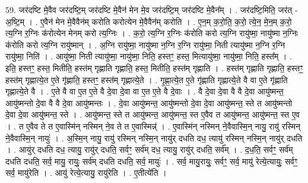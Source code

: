 \documentclass[17pt]{extarticle}
\begin{document}
59. जर॑दष्टि मे॒वैव जर॑दष्टि॒म् जर॑दष्टि मे॒वैन॑ मेन मे॒व जर॑दष्टि॒म् जर॑दष्टि मे॒वैन᳚म् । . जर॑दष्टि॒मिति॒ जर॑त् - अ॒ष्टि॒म् । . ए॒वैन॑ मेन मे॒वैवैन॑म् करोति करोत्येन मे॒वैवैन॑म् करोति । . ए॒न॒म् क॒रो॒ति॒ क॒रो॒ त्ये॒न॒ मे॒न॒म् क॒रो॒ त्य॒ग्नि र॒ग्निः क॑रोत्येन मेनम् करो त्य॒ग्निः । . क॒रो॒ त्य॒ग्नि र॒ग्निः क॑रोति करो त्य॒ग्नि रायु॑ष्मा॒ नायु॑ष्मा न॒ग्निः क॑रोति करो त्य॒ग्नि रायु॑ष्मान् । . अ॒ग्नि रायु॑ष्मा॒ नायु॑ष्मा न॒ग्नि र॒ग्नि रायु॑ष्मा॒ निती त्यायु॑ष्मा न॒ग्नि र॒ग्नि रायु॑ष्मा॒ निति॑ । . आयु॑ष्मा॒ निती त्यायु॑ष्मा॒ नायु॑ष्मा॒ निति॒ हस्तꣳ॒॒ हस्त॒ मित्यायु॑ष्मा॒ नायु॑ष्मा॒ निति॒ हस्त᳚म् । . इति॒ हस्तꣳ॒॒ हस्त॒ मितीति॒ हस्त॑म् गृह्णाति गृह्णाति॒ हस्त॒ मितीति॒ हस्त॑म् गृह्णाति । . हस्त॑म् गृह्णाति गृह्णाति॒ हस्तꣳ॒॒ हस्त॑म् गृह्णात्ये॒त ए॒ते गृ॑ह्णाति॒ हस्तꣳ॒॒ हस्त॑म् गृह्णात्ये॒ते । . गृ॒ह्णा॒त्ये॒त ए॒ते गृ॑ह्णाति गृह्णात्ये॒ते वै वा ए॒ते गृ॑ह्णाति गृह्णात्ये॒ते वै । . ए॒ते वै वा ए॒त ए॒ते वै दे॒वा दे॒वा वा ए॒त ए॒ते वै दे॒वाः । . वै दे॒वा दे॒वा वै वै दे॒वा आयु॑ष्मन्त॒ आयु॑ष्मन्तो दे॒वा वै वै दे॒वा आयु॑ष्मन्तः । . दे॒वा आयु॑ष्मन्त॒ आयु॑ष्मन्तो दे॒वा दे॒वा आयु॑ष्मन्त॒ स्ते त आयु॑ष्मन्तो दे॒वा दे॒वा आयु॑ष्मन्त॒ स्ते । . आयु॑ष्मन्त॒ स्ते त आयु॑ष्मन्त॒ आयु॑ष्मन्त॒ स्त ए॒वैव त आयु॑ष्मन्त॒ आयु॑ष्मन्त॒ स्त ए॒व । . त ए॒वैव ते त ए॒वास्मि॑न् नस्मिन् ने॒व ते त ए॒वास्मिन्न्॑ । . ए॒वास्मि॑न् नस्मिन् ने॒वैवास्मि॒न् नायु॒ रायु॑ रस्मिन् ने॒वैवास्मि॒न् नायुः॑ । . अ॒स्मि॒न् नायु॒ रायु॑ रस्मिन् नस्मि॒न् नायु॑र् दधति दध॒ त्यायु॑ रस्मिन् नस्मि॒न् नायु॑र् दधति । . आयु॑र् दधति दध॒ त्यायु॒ रायु॑र् दधति॒ सर्वꣳ॒॒ सर्व॑म् दध॒ त्यायु॒ रायु॑र् दधति॒ सर्व᳚म् । . द॒ध॒ति॒ सर्वꣳ॒॒ सर्व॑म् दधति दधति॒ सर्व॒ मायु॒ रायुः॒ सर्व॑म् दधति दधति॒ सर्व॒ मायुः॑ । . सर्व॒ मायु॒रायुः॒ सर्वꣳ॒॒ सर्व॒ मायु॑ रेत्ये॒त्यायुः॒ सर्वꣳ॒॒ सर्व॒ मायु॑रेति । . आयु॑ रेत्ये॒त्यायु॒ रायु॑रेति । . ए॒तीत्ये॑ति । \newline
\pagebreak
{}
\end{document}
